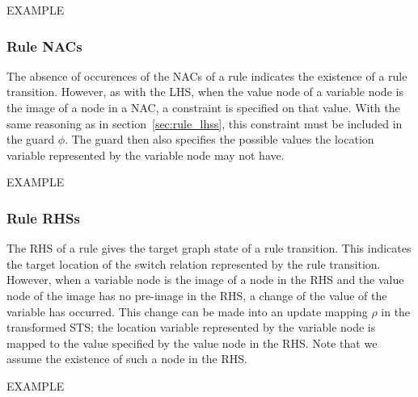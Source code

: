 EXAMPLE

\subsubsection{Rule NACs}
The absence of occurences of the NACs of a rule indicates the existence of a rule transition. However, as with the LHS, when the value node of a variable node is the image of a node in a NAC, a constraint is specified on that value. With the same reasoning as in section~\ref{sec:rule_lhss}, this constraint must be included in the guard $\phi$. The guard then also specifies the possible values the location variable represented by the variable node may not have.

EXAMPLE

\subsubsection{Rule RHSs}
The RHS of a rule gives the target graph state of a rule transition. This indicates the target location of the switch relation represented by the rule transition. However, when a variable node is the image of a node in the RHS and the value node of the image has no pre-image in the RHS, a change of the value of the variable has occurred. This change can be made into an update mapping $\rho$ in the transformed STS; the location variable represented by the variable node is mapped to the value specified by the value node in the RHS. Note that we assume the existence of such a node in the RHS.

EXAMPLE
